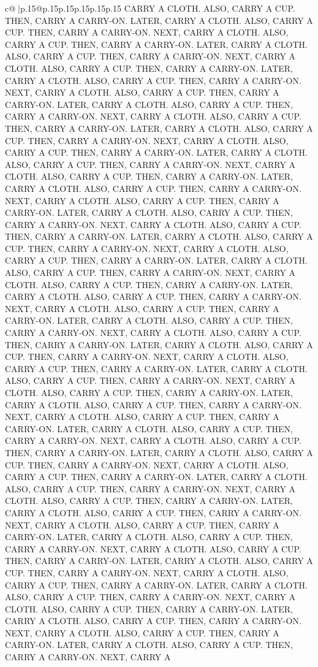 \documentclass{article}
\begin{document}
{\begin{supertabular}{c@{$\;$}|p{.15\linewidth}@{}p{.15\linewidth}p{.15\linewidth}p{.15\linewidth}p{.15\linewidth}p{.15\linewidth}}
{{{CARRY A CLOTH. ALSO, CARRY A CUP. THEN, CARRY A CARRY{-}ON. LATER, CARRY A CLOTH. ALSO, CARRY A CUP. THEN, CARRY A CARRY{-}ON. NEXT, CARRY A CLOTH. ALSO, CARRY A CUP. THEN, CARRY A CARRY{-}ON. LATER, CARRY A CLOTH. ALSO, CARRY A CUP. THEN, CARRY A CARRY{-}ON. NEXT, CARRY A CLOTH. ALSO, CARRY A CUP. THEN, CARRY A CARRY{-}ON. LATER, CARRY A CLOTH. ALSO, CARRY A CUP. THEN, CARRY A CARRY{-}ON. NEXT, CARRY A CLOTH. ALSO, CARRY A CUP. THEN, CARRY A CARRY{-}ON. LATER, CARRY A CLOTH. ALSO, CARRY A CUP. THEN, CARRY A CARRY{-}ON. NEXT, CARRY A CLOTH. ALSO, CARRY A CUP. THEN, CARRY A CARRY{-}ON. LATER, CARRY A CLOTH. ALSO, CARRY A CUP. THEN, CARRY A CARRY{-}ON. NEXT, CARRY A CLOTH. ALSO, CARRY A CUP. THEN, CARRY A CARRY{-}ON. LATER, CARRY A CLOTH. ALSO, CARRY A CUP. THEN, CARRY A CARRY{-}ON. NEXT, CARRY A CLOTH. ALSO, CARRY A CUP. THEN, CARRY A CARRY{-}ON. LATER, CARRY A CLOTH. ALSO, CARRY A CUP. THEN, CARRY A CARRY{-}ON. NEXT, CARRY A CLOTH. ALSO, CARRY A CUP. THEN, CARRY A CARRY{-}ON. LATER, CARRY A CLOTH. ALSO, CARRY A CUP. THEN, CARRY A CARRY{-}ON. NEXT, CARRY A CLOTH. ALSO, CARRY A CUP. THEN, CARRY A CARRY{-}ON. LATER, CARRY A CLOTH. ALSO, CARRY A CUP. THEN, CARRY A CARRY{-}ON. NEXT, CARRY A CLOTH. ALSO, CARRY A CUP. THEN, CARRY A CARRY{-}ON. LATER, CARRY A CLOTH. ALSO, CARRY A CUP. THEN, CARRY A CARRY{-}ON. NEXT, CARRY A CLOTH. ALSO, CARRY A CUP. THEN, CARRY A CARRY{-}ON. LATER, CARRY A CLOTH. ALSO, CARRY A CUP. THEN, CARRY A CARRY{-}ON. NEXT, CARRY A CLOTH. ALSO, CARRY A CUP. THEN, CARRY A CARRY{-}ON. LATER, CARRY A CLOTH. ALSO, CARRY A CUP. THEN, CARRY A CARRY{-}ON. NEXT, CARRY A CLOTH. ALSO, CARRY A CUP. THEN, CARRY A CARRY{-}ON. LATER, CARRY A CLOTH. ALSO, CARRY A CUP. THEN, CARRY A CARRY{-}ON. NEXT, CARRY A CLOTH. ALSO, CARRY A CUP. THEN, CARRY A CARRY{-}ON. LATER, CARRY A CLOTH. ALSO, CARRY A CUP. THEN, CARRY A CARRY{-}ON. NEXT, CARRY A CLOTH. ALSO, CARRY A CUP. THEN, CARRY A CARRY{-}ON. LATER, CARRY A CLOTH. ALSO, CARRY A CUP. THEN, CARRY A CARRY{-}ON. NEXT, CARRY A CLOTH. ALSO, CARRY A CUP. THEN, CARRY A CARRY{-}ON. LATER, CARRY A CLOTH. ALSO, CARRY A CUP. THEN, CARRY A CARRY{-}ON. NEXT, CARRY A CLOTH. ALSO, CARRY A CUP. THEN, CARRY A CARRY{-}ON. LATER, CARRY A CLOTH. ALSO, CARRY A CUP. THEN, CARRY A CARRY{-}ON. NEXT, CARRY A CLOTH. ALSO, CARRY A CUP. THEN, CARRY A CARRY{-}ON. LATER, CARRY A CLOTH. ALSO, CARRY A CUP. THEN, CARRY A CARRY{-}ON. NEXT, CARRY A CLOTH. ALSO, CARRY A CUP. THEN, CARRY A CARRY{-}ON. LATER, CARRY A CLOTH. ALSO, CARRY A CUP. THEN, CARRY A CARRY{-}ON. NEXT, CARRY A CLOTH. ALSO, CARRY A CUP. THEN, CARRY A CARRY{-}ON. LATER, CARRY A CLOTH. ALSO, CARRY A CUP. THEN, CARRY A CARRY{-}ON. NEXT, CARRY A CLOTH. ALSO, CARRY A CUP. THEN, CARRY A CARRY{-}ON. LATER, CARRY A CLOTH. ALSO, CARRY A CUP. THEN, CARRY A CARRY{-}ON. NEXT, CARRY A CLOTH. ALSO, CARRY A CUP. THEN, CARRY A CARRY{-}ON. LATER, CARRY A CLOTH. ALSO, CARRY A CUP. THEN, CARRY A CARRY{-}ON. NEXT, CARRY A CLOTH. ALSO, CARRY A CUP. THEN, CARRY A CARRY{-}ON. LATER, CARRY A CLOTH. ALSO, CARRY A CUP. THEN, CARRY A CARRY{-}ON. NEXT, CARRY A CLOTH. ALSO, CARRY A CUP. THEN, CARRY A CARRY{-}ON. LATER, CARRY A CLOTH. ALSO, CARRY A CUP. THEN, CARRY A CARRY{-}ON. NEXT, CARRY A }}}
\end{supertabular}}
\end{document}
